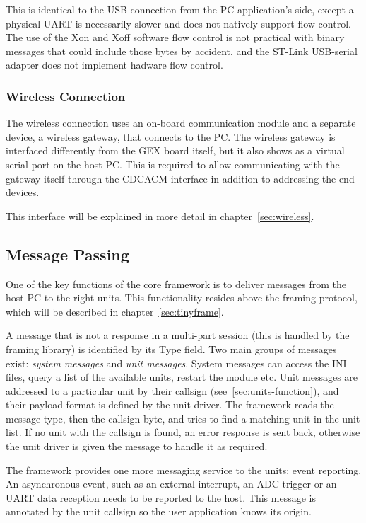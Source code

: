 This is identical to the \gls{USB} connection from the \gls{PC} application's side, except a physical \gls{UART} is necessarily slower and does not natively support flow control. The use of the Xon and Xoff software flow control is not practical with binary messages that could include those bytes by accident, and the ST-Link \gls{USB}-serial adapter does not implement hadware flow control.

\subsubsection{Wireless Connection}

The wireless connection uses an on-board communication module and a separate device, a wireless gateway, that connects to the \gls{PC}. The wireless gateway is interfaced differently from the GEX board itself, but it also shows as a virtual serial port on the host \gls{PC}. This is required to allow communicating with the gateway itself through the \gls{CDCACM} interface in addition to addressing the end devices.

This interface will be explained in more detail in chapter~\ref{sec:wireless}.

\subsection{Message Passing} \label{sec:message_passing}

One of the key functions of the core framework is to deliver messages from the host \gls{PC} to the right units. This functionality resides above the framing protocol, which will be described in chapter~\ref{sec:tinyframe}.

A message that is not a response in a multi-part session (this is handled by the framing library) is identified by its Type field. Two main groups of messages exist: \textit{system messages} and \textit{unit messages}. System messages can access the INI files, query a list of the available units, restart the module etc. Unit messages are addressed to a particular unit by their callsign (see~\ref{sec:units-function}), and their payload format is defined by the unit driver. The framework reads the message type, then the callsign byte, and tries to find a matching unit in the unit list. If no unit with the callsign is found, an error response is sent back, otherwise the unit driver is given the message to handle it as required.

The framework provides one more messaging service to the units: event reporting. An asynchronous event, such as an external interrupt, an \gls{ADC} trigger or an \gls{UART} data reception needs to be reported to the host. This message is annotated by the unit callsign so the user application knows its origin.


